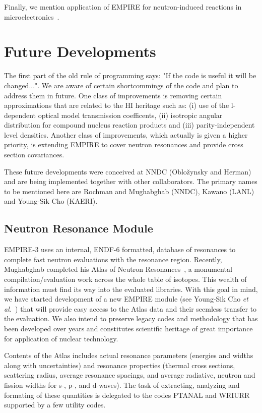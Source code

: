 Finally, we mention application of EMPIRE for neutron-induced reactions in
microelectronics~\cite{wrobel2005unc}.

\section{Future Developments}

The first part of the old rule of programming says: "If the code is useful
it will be changed...". We are aware of certain shortcommings of the code
and plan to address them in future. One class of improvements is removing
certain approximations that are related to the HI heritage such as: (i) use
of the l-dependent optical model transmission coefficents, (ii) isotropic
angular distribution for compound nucleus reaction products and (iii)
parity-independent level densities. Another class of improvements, which
actually is given a higher priority, is extending EMPIRE to cover neutron
resonances and provide cross section covariances.

These future developments were conceived at NNDC (Oblo\v{z}ynsky and Herman)
and are being implemented together with other collaborators. The primary
names to be mentioned here are Rochman and Mughabghab (NNDC), Kawano (LANL)
and Young-Sik Cho (KAERI).

\subsection{Neutron Resonance Module}

EMPIRE-3 uses an internal, ENDF-6 formatted, database of resonances to
complete fast neutron evaluations with the resonance region. Recently,
Mughabghab completed his Atlas of Neutron Resonances~\cite{Mughabghab:06}, a
monumental compilation/evaluation work across the whole table of isotopes.
This wealth of information must find its way into the evaluated libraries.
With this goal in mind, we have started development of a new EMPIRE module
(see Young-Sik Cho \textit{et al.}~\cite{Cho:07}) that will provide easy
access to the Atlas data and their seemless transfer to the evaluation. We
also intend to preserve legacy codes and methodology that has been developed
over years and constitutes scientific heritage of great importance for
application of nuclear technology.

Contents of the Atlas includes actual resonance parameters (energies and
widths along with uncertainties) and resonance properties (thermal cross
sections, scattering radius, average resonance spacings, and average
radiative, neutron and fission widths for s-, p-, and d-waves). The task of
extracting, analyzing and formating of these quantities is delegated to the
codes PTANAL and WRIURR~\cite{Oh:00} supported by a few utility codes.


